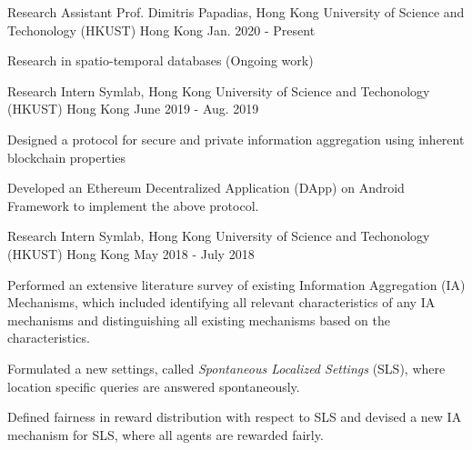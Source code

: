 


\begin{cventries}


    \cventry
    {Research Assistant} %
    {Prof. Dimitris Papadias, Hong Kong University of Science and Techonology (HKUST)} %
    {Hong Kong} %
    {Jan. 2020 - Present} %
    {
    \begin{cvitems}
        \item {Research in spatio-temporal databases (Ongoing work)}
    \end{cvitems}
    }

    \cventry
    {Research Intern} %
    {Symlab, Hong Kong University of Science and Techonology (HKUST)} %
    {Hong Kong} %
    {June 2019 - Aug. 2019} %
    {
    \begin{cvitems} %
        \item {Designed a protocol for secure and private information aggregation using inherent blockchain properties}
        \item {Developed an Ethereum Decentralized Application (DApp) on Android Framework to implement the above protocol.}
    \end{cvitems}
    }

    \cventry
    {Research Intern} %
    {Symlab, Hong Kong University of Science and Techonology (HKUST)} %
    {Hong Kong} %
    {May 2018 - July 2018} %
    {
    \begin{cvitems} %
        \item {Performed an extensive literature survey of existing Information Aggregation (IA) Mechanisms, which included identifying all relevant characteristics of any IA mechanisms and distinguishing all existing mechanisms based on the characteristics.}
        \item {Formulated a new settings, called \emph{Spontaneous Localized Settings} (SLS), where location specific queries are answered spontaneously.}
        \item {Defined fairness in reward distribution with respect to SLS and devised a new IA mechanism for SLS, where all agents are rewarded fairly.}
    \end{cvitems}
    }


\end{cventries}
